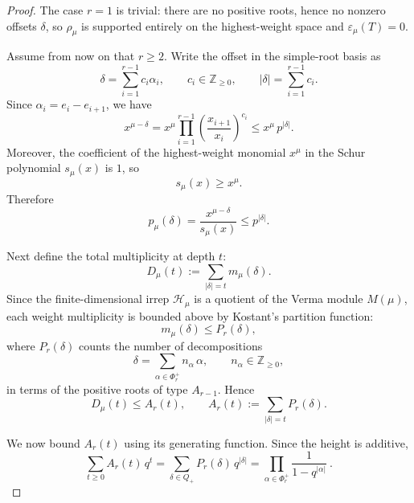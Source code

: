 \documentclass[a4paper,onecolumn,11pt]{quantumarticle}
\def\h{\mathcal{H}}
\begin{document}
\begin{proof}
The case \(r=1\) is trivial: there are no positive roots, hence no nonzero offsets \(\delta\), so \(\rho_\mu\) is supported entirely on the highest-weight space and \(\varepsilon_\mu(T)=0\).

Assume from now on that \(r\ge 2\).
Write the offset in the simple-root basis as
\begin{equation}
    \delta=\sum_{i=1}^{r-1} c_i \alpha_i,
    \qquad c_i\in \mathbb Z_{\ge 0},
    \qquad |\delta|=\sum_{i=1}^{r-1} c_i.
\end{equation}
Since \(\alpha_i=e_i-e_{i+1}\), we have
\begin{equation}
    x^{\mu-\delta}
    =
    x^\mu \prod_{i=1}^{r-1}\left(\frac{x_{i+1}}{x_i}\right)^{c_i}
    \le
    x^\mu\, p^{|\delta|}.
\end{equation}
Moreover, the coefficient of the highest-weight monomial \(x^\mu\) in the Schur polynomial \(s_\mu(x)\) is \(1\), so
\[
s_\mu(x)\ge x^\mu.
\]
Therefore
\begin{equation}\label{eq:tail_weight_bound}
    p_\mu(\delta)=\frac{x^{\mu-\delta}}{s_\mu(x)} \le p^{|\delta|}.
\end{equation}

Next define the total multiplicity at depth \(t\):
\begin{equation}
    D_\mu(t):= \sum_{|\delta|=t} m_\mu(\delta).
\end{equation}
Since the finite-dimensional irrep \(\h_\mu\) is a quotient of the Verma module \(M(\mu)\), each weight multiplicity is bounded above by Kostant's partition function:
\[
m_\mu(\delta)\le P_r(\delta),
\]
where \(P_r(\delta)\) counts the number of decompositions
\[
\delta=\sum_{\alpha\in \Phi_r^+} n_\alpha\,\alpha,
\qquad
n_\alpha\in \mathbb Z_{\ge 0},
\]
in terms of the positive roots of type \(A_{r-1}\).
Hence
\begin{equation}
    D_\mu(t)\le A_r(t),
    \qquad
    A_r(t):= \sum_{|\delta|=t} P_r(\delta).
\end{equation}

We now bound \(A_r(t)\) using its generating function. Since the height is additive,
\[
    \sum_{t\ge 0} A_r(t)\,q^t
    =
    \sum_{\delta\in Q_+} P_r(\delta)\, q^{|\delta|}
    =
    \prod_{\alpha\in \Phi_r^+}\frac{1}{1-q^{|\alpha|}}\ .
\]



\end{proof}
\end{document}
